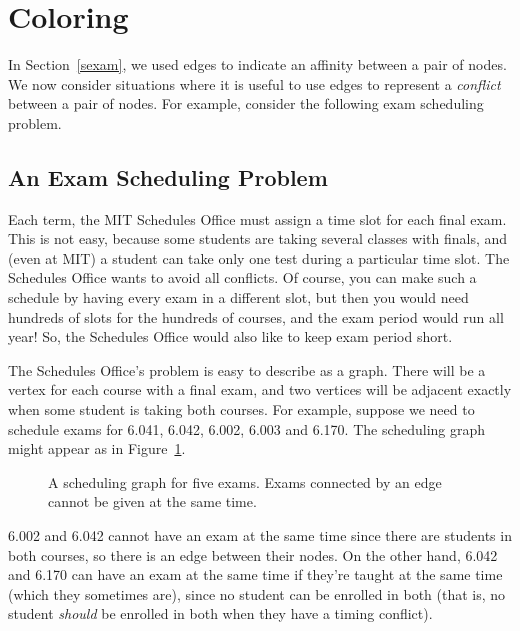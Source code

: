 \section{Coloring}\label{sec:coloring}

In Section~\ref{sexam}, we used edges to indicate an affinity between
a pair of nodes.  We now consider situations where it is useful to use
edges to represent a \emph{conflict} between a pair of nodes.  For
example, consider the following exam scheduling problem.

\subsection{An Exam Scheduling Problem}

Each term, the MIT Schedules Office must assign a time slot for each
final exam.  This is not easy, because some students are taking
several classes with finals, and (even at MIT) a student can take only
one test during a particular time slot.  The Schedules Office wants to
avoid all conflicts.  Of course, you can make such a schedule by
having every exam in a different slot, but then you would need
hundreds of slots for the hundreds of courses, and the exam period
would run all year!  So, the Schedules Office would also like to keep
exam period short.

The Schedules Office's problem is easy to describe as a graph.  There
will be a vertex for each course with a final exam, and two vertices
will be adjacent exactly when some student is taking both courses.
For example, suppose we need to schedule exams for 6.041, 6.042,
6.002, 6.003 and 6.170.  The scheduling graph might appear as in
Figure~\ref{fig:5R}.

\begin{figure}


\caption{A scheduling graph for five exams.  Exams connected by an
  edge cannot be given at the same time.}

\label{fig:5R}

\end{figure}

6.002 and 6.042 cannot have an exam at the same time since there are
students in both courses, so there is an edge between their nodes.  On the
other hand, 6.042 and 6.170 can have an exam at the same time if they're
taught at the same time (which they sometimes are), since no student can
be enrolled in both (that is, no student \emph{should} be enrolled in both
when they have a timing conflict).

